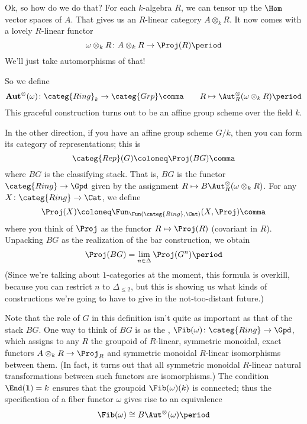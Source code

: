 \documentclass[leqno]{article}
\begin{document}
Ok, so how do we do that?
For each \(k\)-algebra \(R\),
we can tensor up the \(\Hom\) vector spaces of \(A\).
That gives us an \(R\)-linear category \(A \otimes_k R\).
It now comes with a lovely \(R\)-linear functor
\begin{equation*}
    \omega \otimes_k R \colon A \otimes_k R \to \Proj(R) \period
\end{equation*}
We'll just take automorphisms of that!

So we define
\begin{equation*}
    \mathbf{Aut}^{\otimes}(\omega) \colon
    \categ{Ring}_k \to \categ{Grp} \comma \qquad
    R \mapsto \Aut_R^{\otimes}(\omega \otimes_k R) \period
\end{equation*}
This graceful construction turns out to be an affine group scheme
over the field \(k\).

In the other direction, if you have an affine group scheme \(G/k\),
then you can form its category of representations;
this is
\begin{equation*}
    \categ{Rep}(G) \coloneq \Proj(BG) \comma
\end{equation*}
where \(BG\) is the classifying stack.
That is, \(BG\) is the functor \(\categ{Ring} \to \Gpd\)
given by the assignment
\(R \mapsto B\Aut_R^{\otimes}(\omega \otimes_k R)\).
For any \(X \colon \categ{Ring} \to \Cat\), we define
\begin{equation*}
    \Proj(X) \coloneq \Fun_{\Fun(\categ{Ring},\Cat)}(X, \Proj) \comma
\end{equation*}
where you think of \(\Proj\) as the functor \(R \mapsto \Proj(R)\)
(covariant in \(R\)).
Unpacking \(BG\) as the realization of the bar construction,
we obtain
\begin{equation*}
    \Proj(BG) = \lim_{n \in \Delta} \Proj(G^n) \period
\end{equation*}
(Since we're talking about \(1\)-categories at the moment,
this formula is overkill,
because you can restrict \(n\) to \(\Delta_{\leq 2}\),
but this is showing us what kinds of constructions we're going
to have to give in the not-too-distant future.)

Note that the role of \(G\) in this definition
isn't quite as important as that of the stack \(BG\).
One way to think of \(BG\) is as the ,
\(\Fib(\omega) \colon \categ{Ring} \to \Gpd\),
which assigns to any \(R\) the groupoid of
\(R\)-linear, symmetric monoidal, exact functors
\(A \otimes_k R \to \Proj_R\)
and symmetric monoidal \(R\)-linear isomorphisms between them.
(In fact, it turns out that all symmetric monoidal
\(R\)-linear natural transformations between such functors are
isomorphisms.)
The condition \(\End(\mathbf{1}) = k\) ensures that
the groupoid \(\Fib(\omega)(k)\) is connected;
thus the specification of a fiber functor \(\omega\) gives rise to
an equivalence 
\begin{equation*}
    \Fib(\omega) \cong B\Aut^{\otimes}(\omega) \period
\end{equation*}
\end{document}
